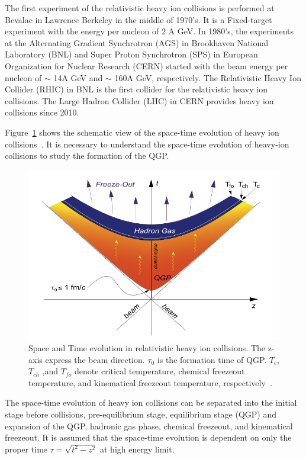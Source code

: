 The first experiment of the relativistic heavy ion collisions is performed at Bevalac in Lawrence Berkeley in the middle of 1970’s.
It is a Fixed-target experiment with the energy per nucleon of 2 A GeV.  
In 1980's, the experiments at the Alternating Gradient Synchrotron (AGS) in Brookhaven National Laboratory (BNL) and Super Proton Synchrotron (SPS) in European Organization for Nuclear Research (CERN) started with the beam energy per nucleon of $\sim$ 14A GeV and $\sim$ 160A GeV, respectively. 
The Relativistic Heavy Ion Collider (RHIC) in BNL is the first collider for the relativistic heavy ion collisions. 
The Large Hadron Collider (LHC) in CERN provides heavy ion collisions since 2010.  

Figure~\ref{fig_1_hic} shows the schematic view of the space-time evolution of heavy ion collisions~\cite{bib_spacetime}. 
It is necessary to understand the space-time evolution of heavy-ion collisions to study the formation of the QGP.
\begin{figure}[!h]
  \centering
  \includegraphics[width=12cm]{chap1/figure/hic.png}
  \caption{Space and Time evolution in relativistic heavy ion collisions. The z-axis express the beam direction. $\tau_{0}$ is the formation time of QGP. $T_{c}$, $T_{ch}$ ,and $T_{fo}$ denote critical temperature, chemical freezeout temperature, and kinematical freezeout temperature, respectively~\cite{bib_spacetime}.}
  \label{fig_1_hic}
\end{figure}
The space-time evolution of heavy ion collisions can be separated into the initial stage before collisions, pre-equilibrium stage, equilibrium stage (QGP) and expansion of the QGP, hadronic gas phase, chemical freezeout, and kinematical freezeout.
It is assumed that the space-time evolution is dependent on only the proper time $\tau=\sqrt{t^{2}-z^{2}}$ at high energy limit. 
